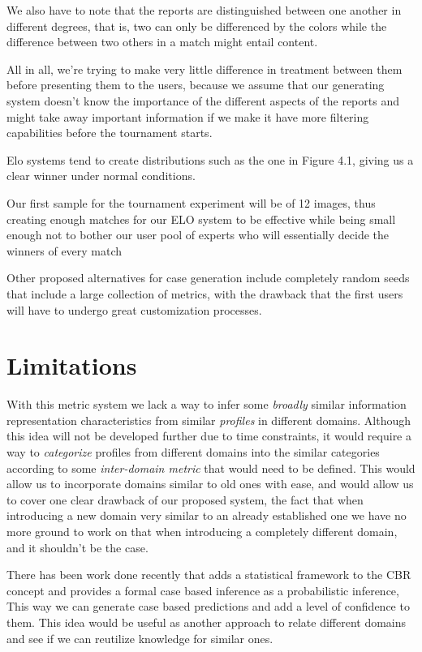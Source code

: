 We also have to note that the reports are distinguished between one another in different degrees, that is, two can only be differenced by the colors while the difference between two others in a match might entail content.

All in all, we're trying to make very little difference in treatment between them before presenting them to the users, because we assume that our generating system doesn't know the importance of the different aspects of the reports and might take away important information if we make it have more filtering capabilities before the tournament starts.


Elo systems tend to create distributions such as the one in Figure 4.1, giving us a clear winner under normal conditions.

Our first sample for the tournament experiment will be of 12 images, thus creating enough matches for our ELO system to be effective while being small enough not to bother our user pool of experts who will essentially decide the winners of every match

Other proposed alternatives for case generation include completely random seeds that include a large collection of metrics, with the drawback that the first users will have to undergo great customization processes.

\section{Limitations}
\label{cap4:sec:limitations}
With this metric system we lack a way to infer some \textit{broadly} similar information representation characteristics from similar \textit{profiles} in different domains.
Although this idea will not be developed further due to time constraints, it would require a way to \textit{categorize} profiles from different domains into the similar categories according to some \textit{inter-domain metric} that would need to be defined.
This would allow us to incorporate domains similar to old ones with ease, and would allow us to cover one clear drawback of our proposed system, the fact that when introducing a new domain very similar to an already established one we have no more ground to work on that when introducing a completely different domain, and it shouldn't be the case.

There has been work done recently that adds a statistical framework to the CBR concept and provides a formal case based inference as a probabilistic inference, This way we can generate case based predictions and add a level of confidence to them. \cite{Hullermeier2007}
This idea would be useful as another approach to relate different domains and see if we can reutilize knowledge for similar ones.

